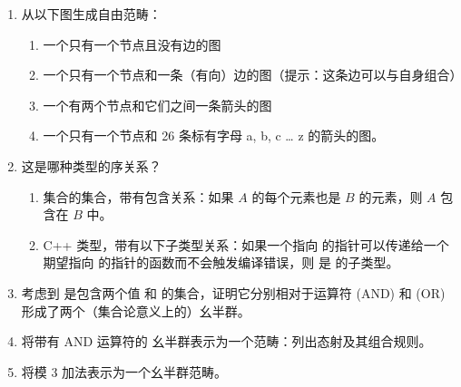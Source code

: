\begin{enumerate}
  \tightlist
  \item
        从以下图生成自由范畴：

        \begin{enumerate}
          \tightlist
          \item
                一个只有一个节点且没有边的图
          \item
                一个只有一个节点和一条（有向）边的图（提示：这条边可以与自身组合）
          \item
                一个有两个节点和它们之间一条箭头的图
          \item
                一个只有一个节点和 26 条标有字母 a, b, c … z 的箭头的图。
        \end{enumerate}
  \item
        这是哪种类型的序关系？

        \begin{enumerate}
          \tightlist
          \item
                集合的集合，带有包含关系：如果 $A$ 的每个元素也是 $B$ 的元素，则 $A$ 包含在 $B$ 中。
          \item
                C++ 类型，带有以下子类型关系：如果一个指向  的指针可以传递给一个期望指向  的指针的函数而不会触发编译错误，则  是  的子类型。
        \end{enumerate}
  \item
        考虑到  是包含两个值  和  的集合，证明它分别相对于运算符 \code{\&\&} (AND) 和 \code{||} (OR) 形成了两个（集合论意义上的）幺半群。
  \item
        将带有 AND 运算符的  幺半群表示为一个范畴：列出态射及其组合规则。
  \item
        将模 3 加法表示为一个幺半群范畴。
\end{enumerate}